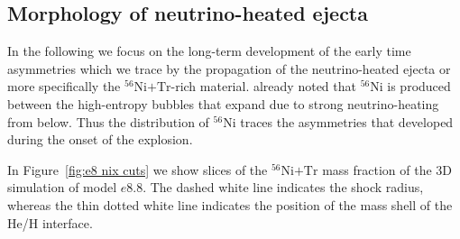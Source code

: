 \documentclass[fleqn,usenatbib]{mnras}
\newcommand{\nickel}{\ensuremath{\mathrm{^{56}Ni}}\xspace}
\newcommand{\tracer}{\ensuremath{\mathrm{Tr}}\xspace}
\begin{document}
\subsection{Morphology of neutrino-heated ejecta}
In the following we focus on the long-term development of the early time asymmetries which we trace by the propagation of the neutrino-heated ejecta or more specifically the $\nickel\mathord{+}\tracer$-rich material. \cite{Kifonidis2003} already noted that \nickel is produced between the high-entropy bubbles that expand due to strong neutrino-heating from below. Thus the distribution of \nickel traces the asymmetries that developed during the onset of the explosion. 

In Figure~\ref{fig:e8 nix cuts} we show slices of the $\nickel\mathord{+}\tracer$ mass fraction of the 3D simulation of model $e8.8$. The dashed white line indicates the shock radius, whereas the thin dotted white line indicates the position of the mass shell of the He/H interface.
\end{document}
